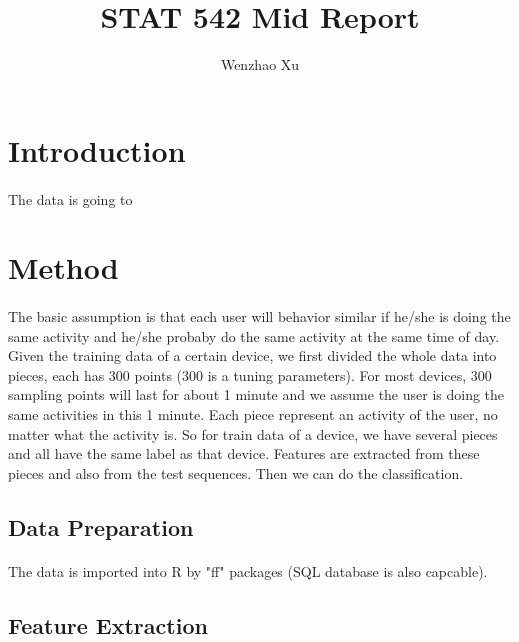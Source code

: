 \documentclass{article}
\author{Wenzhao Xu}
\title{STAT 542 Mid Report}
\begin{document}
	\maketitle
	
	\section{Introduction} %
	\label{sec:introduction}
	\paragraph{} The data is going to 
	
	
	\section{Method} %
	\label{sec:method}
	\paragraph{} The basic assumption is that each user will behavior similar if he/she is doing the same activity and he/she probaby do the same activity at the same time of day. Given the training data of a certain device, we first divided the whole data into pieces, each has 300 points (300 is a tuning parameters). For most devices, 300 sampling points will last for about 1 minute and we assume the user is doing the same activities in this 1 minute. Each piece represent an activity of the user, no matter what the activity is. So for train data of a device, we have several pieces and all have the same label as that device. Features are extracted from these pieces and also from the test sequences. Then we can do the classification. 
	
		\subsection{Data Preparation} %
		\label{sub:idea}
		\paragraph{} The data is imported into R by "ff" packages (SQL database is also capcable). 
		
	
		\subsection{Feature Extraction} %
		\label{sub:feature_extraction}
		
\end{document}
